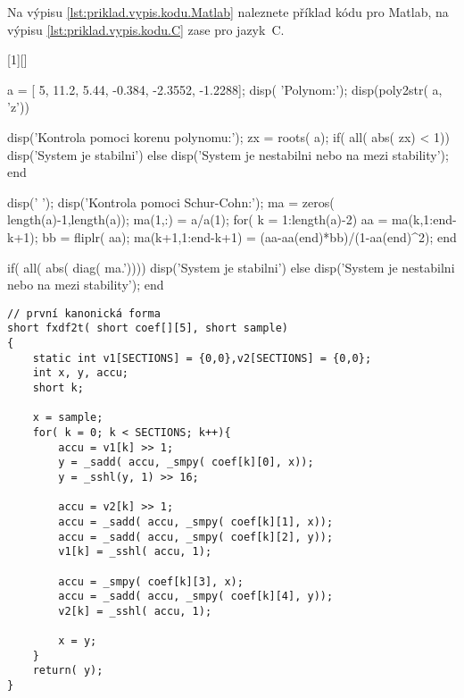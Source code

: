 \clearpage

Na výpisu \ref{lst:priklad.vypis.kodu.Matlab} naleznete příklad kódu pro Matlab, na výpisu \ref{lst:priklad.vypis.kodu.C} zase pro jazyk~C.

[1][]{%
%
%
\lstset{language=Matlab,numbers=left,#1}%
}{%
%
%
}

\begin{matlab}[frame=single,float=htbp,caption={Příklad Schur-Cohnova testu stability v~prostředí Matlab.},label=lst:priklad.vypis.kodu.Matlab,numberstyle=\scriptsize, numbersep=7pt]

a = [ 5, 11.2, 5.44, -0.384, -2.3552, -1.2288];
disp( 'Polynom:'); disp(poly2str( a, 'z'))

disp('Kontrola pomoci korenu polynomu:');
zx = roots( a);
if( all( abs( zx) < 1))
    disp('System je stabilni')
else
    disp('System je nestabilni nebo na mezi stability');
end

disp(' '); disp('Kontrola pomoci Schur-Cohn:');
ma = zeros( length(a)-1,length(a));
ma(1,:) = a/a(1);
for( k = 1:length(a)-2)
    aa = ma(k,1:end-k+1);
    bb = fliplr( aa);
    ma(k+1,1:end-k+1) = (aa-aa(end)*bb)/(1-aa(end)^2);
end

if( all( abs( diag( ma.'))))
    disp('System je stabilni')
else
    disp('System je nestabilni nebo na mezi stability');
end
\end{matlab}

\noindent
\begin{minipage}{\linewidth}



\begin{lstlisting}[frame=single,numbers=right,caption={Příklad implementace první kanonické formy v~jazyce C.},label=lst:priklad.vypis.kodu.C,basicstyle=\ttfamily\small, keywordstyle=\color{black}\bfseries\underbar,]
// první kanonická forma
short fxdf2t( short coef[][5], short sample)
{
	static int v1[SECTIONS] = {0,0},v2[SECTIONS] = {0,0};
	int x, y, accu;
	short k;

	x = sample;
	for( k = 0; k < SECTIONS; k++){
		accu = v1[k] >> 1;
		y = _sadd( accu, _smpy( coef[k][0], x));
		y = _sshl(y, 1) >> 16;

		accu = v2[k] >> 1;
		accu = _sadd( accu, _smpy( coef[k][1], x));
		accu = _sadd( accu, _smpy( coef[k][2], y));
		v1[k] = _sshl( accu, 1);

		accu = _smpy( coef[k][3], x);
		accu = _sadd( accu, _smpy( coef[k][4], y));
		v2[k] = _sshl( accu, 1);

		x = y;
	}
	return( y);
}
\end{lstlisting}
\end{minipage}


